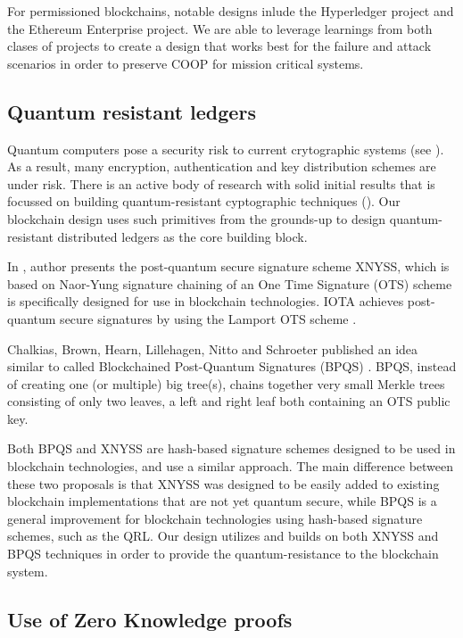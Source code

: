 For permissioned blockchains, notable designs inlude the Hyperledger project and the Ethereum Enterprise project. We are
able to leverage learnings from both clases of projects to create a design that works best for the failure and
attack scenarios in order to preserve COOP for mission critical systems.

\subsection{Quantum resistant ledgers}

Quantum computers pose a security risk to current crytographic systems (see \cite{dasgupta2019}). As a result, many
encryption, authentication and key distribution schemes are under risk. There is an active body of research with solid
initial results that is focussed on building quantum-resistant cyptographic techniques (\cite{qrl2016}). Our blockchain design
uses such primitives from the grounds-up to design quantum-resistant distributed ledgers as the core building block.

In \cite{linde2018}, author presents the post-quantum secure signature scheme XNYSS, which is
based on Naor-Yung signature chaining of an One Time Signature (OTS) scheme is specifically designed for use in blockchain
technologies. IOTA \cite{iota2018} achieves post-quantum secure signatures by using the Lamport
OTS scheme \cite{lamport1979}.

Chalkias, Brown, Hearn, Lillehagen, Nitto and Schroeter published an idea similar to \cite{linde2018} called Blockchained
Post-Quantum Signatures (BPQS) \cite{bpqs}. BPQS, instead of creating one (or multiple) big tree(s), chains together very small
Merkle trees consisting of only two leaves, a left and right leaf both containing an OTS public key. 

Both BPQS and XNYSS are hash-based signature schemes designed to be used in blockchain technologies, and use a similar
approach. The main difference between these two proposals is that XNYSS was designed to be easily added to existing
blockchain implementations that are not yet quantum secure, while BPQS is a general improvement for blockchain
technologies using hash-based signature schemes, such as the QRL. Our design utilizes and builds on both XNYSS and BPQS
techniques in order to provide the quantum-resistance to the blockchain system.

\subsection{Use of Zero Knowledge proofs}

